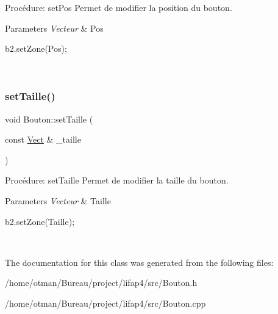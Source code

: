 Procédure\+: set\+Pos Permet de modifier la position du bouton. 


\begin{DoxyParams}{Parameters}
{\em Vecteur} & Pos 
\begin{DoxyCode}
b2.setZone(Pos);
\end{DoxyCode}
 \\
\hline
\end{DoxyParams}
\mbox{\label{classBouton_a972600e88d0a65431c27bec898fbba36}} 
\subsubsection{\texorpdfstring{set\+Taille()}{setTaille()}}
{\footnotesize\ttfamily void Bouton\+::set\+Taille (\begin{DoxyParamCaption}\item[{const \hyperlink{classVect}{Vect} \&}]{\+\_\+taille }\end{DoxyParamCaption})}



Procédure\+: set\+Taille Permet de modifier la taille du bouton. 


\begin{DoxyParams}{Parameters}
{\em Vecteur} & Taille 
\begin{DoxyCode}
b2.setZone(Taille);
\end{DoxyCode}
 \\
\hline
\end{DoxyParams}


The documentation for this class was generated from the following files\+:\begin{DoxyCompactItemize}
\item 
/home/otman/\+Bureau/project/lifap4/src/Bouton.\+h\item 
/home/otman/\+Bureau/project/lifap4/src/Bouton.\+cpp\end{DoxyCompactItemize}
